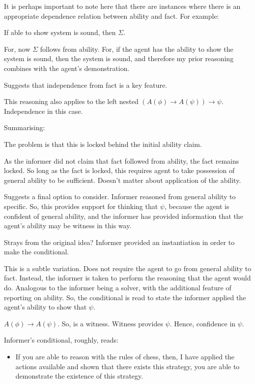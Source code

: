 \documentclass[10pt]{article}
\newcommand{\hozlinedash}[0]{%
  \noindent\hdashrule[0.5ex][c]{\textwidth}{.1pt}{2.5pt}
}
\begin{document}
It is perhaps important to note here that there are instances where there is an appropriate dependence relation between ability and fact.
For example:

If able to show system is sound, then \(\Sigma\).

For, now \(\Sigma\) follows from ability.
For, if the agent has the ability to show the system is sound, then the system is sound, and therefore my prior reasoning combines with the agent's demonstration.

Suggests that independence from fact is a key feature.

\hozlinedash

This reasoning also applies to the left nested \((A(\phi) \rightarrow A(\psi)) \rightarrow \psi\).
Independence in this case.

\hozlinedash

Summarising:

The problem is that this is locked behind the initial ability claim.

As the informer did not claim that fact followed from ability, the fact remains locked.
So long as the fact is locked, this requires agent to take possession of general ability to be sufficient.
Doesn't matter about application of the ability.

\hozlinedash

Suggests a final option to consider.
Informer reasoned from general ability to specific.
So, this provides support for thinking that \(\psi\), because the agent is confident of general ability, and the informer has provided information that the agent's ability may be witness in this way.

\hozlinedash

Strays from the original idea?
Informer provided an instantiation in order to make the conditional.

This is a subtle variation.
Does not require the agent to go from general ability to fact.
Instead, the informer is taken to perform the reasoning that the agent would do.
Analogous to the informer being a solver, with the additional feature of reporting on ability.
So, the conditional is read to state the informer applied the agent's ability to show that \(\psi\).

\(A(\phi) \rightarrow A(\psi)\).
So, is a witness.
Witness provides \(\psi\).
Hence, confidence in \(\psi\).

Informer's conditional, roughly, reads:

\begin{itemize}
\item If you are able to reason with the rules of chess, then, I have applied the actions available and shown that there exists this strategy, you are able to demonstrate the existence of this strategy.
\end{itemize}
\end{document}
